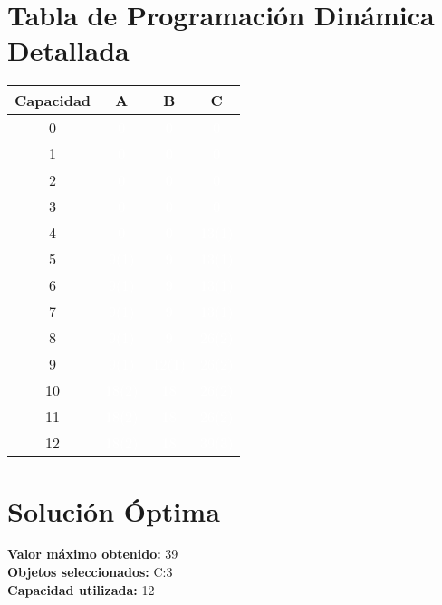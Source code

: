 \documentclass{article}
\begin{document}
\section*{Tabla de Programación Dinámica Detallada}
\begin{center}
\scriptsize
\begin{tabular}{|c|c|c|c|}
\hline
Capacidad & A & B & C \\ \hline
0 & \cellcolor{rojo}\textcolor{white}{0} & \cellcolor{rojo}\textcolor{white}{0} & \cellcolor{rojo}\textcolor{white}{0} \\ \hline
1 & \cellcolor{rojo}\textcolor{white}{0} & \cellcolor{rojo}\textcolor{white}{0} & \cellcolor{rojo}\textcolor{white}{0} \\ \hline
2 & \cellcolor{rojo}\textcolor{white}{0} & \cellcolor{rojo}\textcolor{white}{0} & \cellcolor{rojo}\textcolor{white}{0} \\ \hline
3 & \cellcolor{rojo}\textcolor{white}{0} & \cellcolor{rojo}\textcolor{white}{0} & \cellcolor{rojo}\textcolor{white}{0} \\ \hline
4 & \cellcolor{rojo}\textcolor{white}{0} & \cellcolor{rojo}\textcolor{white}{0} & \cellcolor{verde}\textcolor{white}{13(1)} \\ \hline
5 & \cellcolor{verde}\textcolor{white}{9(1)} & \cellcolor{rojo}\textcolor{white}{9} & \cellcolor{verde}\textcolor{white}{13(1)} \\ \hline
6 & \cellcolor{verde}\textcolor{white}{9(1)} & \cellcolor{rojo}\textcolor{white}{9} & \cellcolor{verde}\textcolor{white}{13(1)} \\ \hline
7 & \cellcolor{verde}\textcolor{white}{9(1)} & \cellcolor{rojo}\textcolor{white}{9} & \cellcolor{verde}\textcolor{white}{13(1)} \\ \hline
8 & \cellcolor{verde}\textcolor{white}{9(1)} & \cellcolor{rojo}\textcolor{white}{9} & \cellcolor{verde}\textcolor{white}{26(2)} \\ \hline
9 & \cellcolor{verde}\textcolor{white}{9(1)} & \cellcolor{verde}\textcolor{white}{12(1)} & \cellcolor{verde}\textcolor{white}{26(2)} \\ \hline
10 & \cellcolor{verde}\textcolor{white}{18(2)} & \cellcolor{rojo}\textcolor{white}{18} & \cellcolor{verde}\textcolor{white}{26(2)} \\ \hline
11 & \cellcolor{verde}\textcolor{white}{18(2)} & \cellcolor{rojo}\textcolor{white}{18} & \cellcolor{verde}\textcolor{white}{26(2)} \\ \hline
12 & \cellcolor{verde}\textcolor{white}{18(2)} & \cellcolor{rojo}\textcolor{white}{18} & \cellcolor{verde}\textcolor{white}{39(3)} \\ \hline
\end{tabular}
\end{center}
\normalsize

\section*{Solución Óptima}
\textbf{Valor máximo obtenido:} 39\\
\textbf{Objetos seleccionados:} C:3\\
\textbf{Capacidad utilizada:} 12\\
\end{document}
